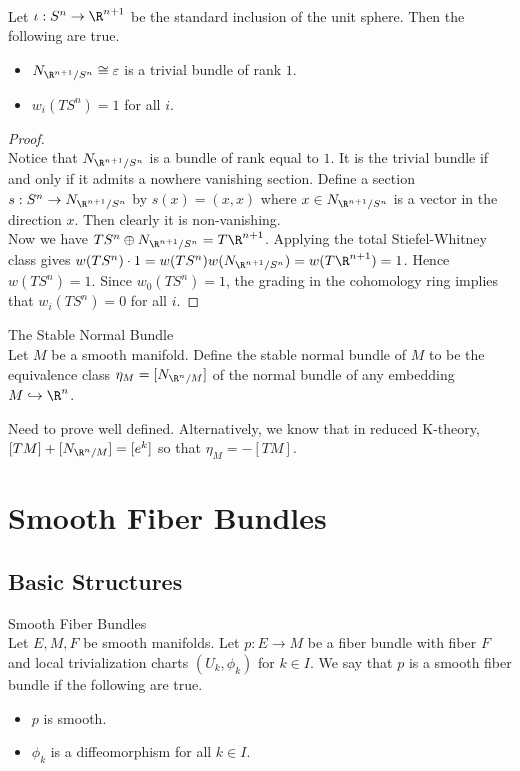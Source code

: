 \documentclass[a4paper]{article}
\begin{document}
\begin{eg}{}{}\\
Let $\iota:S^n\to\R^{n+1}$ be the standard inclusion of the unit sphere. Then the following are true. 
\begin{itemize}
\item $N_{\R^{n+1}/S^n}\cong\varepsilon$ is a trivial bundle of rank $1$. 
\item $w_i(TS^n)=1$ for all $i$. 
\end{itemize}
\begin{proof}\\
Notice that $N_{\R^{n+1}/S^n}$ is a bundle of rank equal to $1$. It is the trivial bundle if and only if it admits a nowhere vanishing section. Define a section $s:S^n\to N_{\R^{n+1}/S^n}$ by $s(x)=(x,x)$ where $x\in N_{\R^{n+1}/S^n}$ is a vector in the direction $x$. Then clearly it is non-vanishing. \\

Now we have $TS^n\oplus N_{\R^{n+1}/S^n}=T\R^{n+1}$. Applying the total Stiefel-Whitney class gives $w(TS^n)\cdot 1=w(TS^n)w(N_{\R^{n+1}/S^n})=w(T\R^{n+1})=1$. Hence $w(TS^n)=1$. Since $w_0(TS^n)=1$, the grading in the cohomology ring implies that $w_i(TS^n)=0$ for all $i$. 
\end{proof}
\end{eg}

\begin{defn}{The Stable Normal Bundle}{}\\
Let $M$ be a smooth manifold. Define the stable normal bundle of $M$ to be the equivalence class $\eta_M=[N_{\R^n/M}]$ of the normal bundle of any embedding $M\hookrightarrow\R^n$. 
\end{defn}

Need to prove well defined. Alternatively, we know that in reduced K-theory, $[TM]+[N_{\R^n/M}]=[e^k]$ so that $\eta_M=-[TM]$. 

\pagebreak
\section{Smooth Fiber Bundles}
\subsection{Basic Structures}
\begin{defn}{Smooth Fiber Bundles}{}\\
Let $E,M,F$ be smooth manifolds. Let $p:E\to M$ be a fiber bundle with fiber $F$ and local trivialization charts $(U_k,\phi_k)$ for $k\in I$. We say that $p$ is a smooth fiber bundle if the following are true. 
\begin{itemize}
\item $p$ is smooth. 
\item $\phi_k$ is a diffeomorphism for all $k\in I$. 
\end{itemize}
\end{defn}
\end{document}

